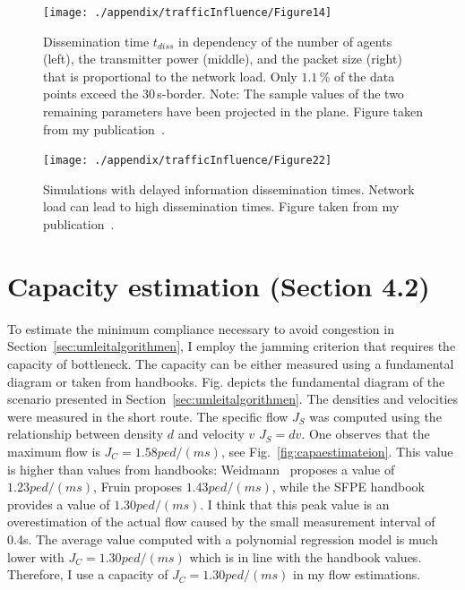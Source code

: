 \begin{figure}[hbt!]
\centering
\texttt{[image: ./appendix/trafficInfluence/Figure14]}%
\caption[Dissemination time over the three parameters]{Dissemination time $t_{diss}$ in dependency of the number of agents (left), the transmitter power (middle), and the packet size (right) that is proportional to the network load. Only $1.1$\,\% of the data points exceed the $30$\,s-border. Note: The sample values of the two remaining parameters have been projected in the plane. Figure taken from my publication~\cite{mayr-2021-com}. }%
\label{fig:scatter}%
\end{figure}

\begin{figure}[H]
\centering
\texttt{[image: ./appendix/trafficInfluence/Figure22]}%
\caption[Simulations with delayed information dissemination times]{Simulations with delayed information dissemination times. Network load can lead to high dissemination times. Figure taken from my publication~\cite{mayr-2021-com}.}%
\label{fig:subresults}%
\end{figure}%









\chapter{Capacity estimation (Section 4.2)}
\label{sec:capacityestimation}
To estimate the minimum compliance necessary to avoid congestion in Section~\ref{sec:umleitalgorithmen}, I employ the jamming criterion that requires the capacity of bottleneck. The capacity can be either measured using a fundamental diagram or taken from handbooks. 
Fig. depicts the fundamental diagram of the scenario presented in Section~\ref{sec:umleitalgorithmen}. The densities and velocities were measured in the short route. The specific flow $J_S$ was computed using the relationship between density $d$ and velocity $v$ $J_S=d v $. One observes that the maximum flow is $J_C=1.58 ped/(ms)$, see Fig.~\ref{fig:capaestimateion}.
This value is higher than values from handbooks: Weidmann~\cite{weidmann-1994-cdyn} proposes a value of $1.23 ped/(ms)$, Fruin \cite{fruin-1964-cdyn} proposes $1.43 ped/(ms)$, while the SFPE handbook~\cite{hurley-2016-cdyn} provides a value of $1.30 ped/(ms)$. I think that this peak value is an overestimation of the actual flow caused by the small measurement interval of 0.4s. The average value computed with a polynomial regression model is much lower with $J_C=1.30 ped/(ms)$ which is in line with the handbook values. Therefore, I use a capacity of $J_C=1.30 ped/(ms)$ in my flow estimations.



